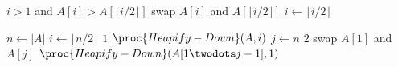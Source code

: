 \begin{codebox}
  \li \While $i > 1$ and $A[i] > A[\lfloor i/2 \rfloor]$ \Do
  \li     swap $A[i]$ and $A[\lfloor i/2 \rfloor]$
  \li     $i \gets \lfloor i/2 \rfloor$
      \End
\end{codebox}

\begin{codebox}
  \li $n \gets |A|$
  \li \For $i \gets \lfloor n/2 \rfloor$ \Downto $1$ \Do
  \li     $\proc{Heapify-Down}(A, i)$
      \End
  \li \For $j \gets n$ \Downto $2$ \Do
  \li     swap $A[1]$ and $A[j]$
  \li     $\proc{Heapify-Down}(A[1 \twodots j-1], 1)$
      \End
\end{codebox}
